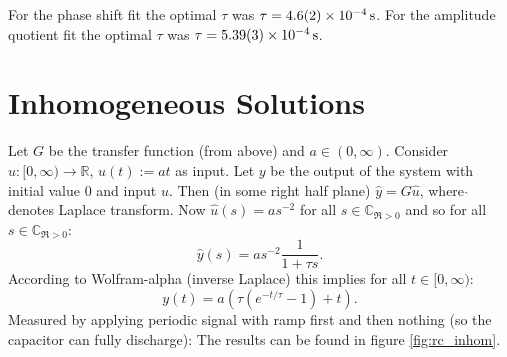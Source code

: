 \documentclass[10pt, a4paper]{article} %
\begin{document}
For the phase shift fit the optimal $\tau$ was $\tau = \SI{4.6 \pm 0.2 e-4}{\second}$.
For the amplitude quotient fit the optimal $\tau$ was $\tau = \SI{5.39 \pm 0.03 e-4}{\second}$.
\section{Inhomogeneous Solutions}
Let $G$ be the transfer function (from above) and $a \in (0, \infty)$.
Consider $u :[0, \infty) \to \mathbb{R}$, $u(t):=a t$ as input.
Let $y$ be the output of the system with initial value $0$ and input $u$.
Then (in some right half plane) $\hat y = G  \hat u$, where $\hat{}$ denotes Laplace transform.
Now $\hat u(s) = a s^{-2}$ for all $s \in \mathbb{C}_{\Re >0}$ and so for all $s \in \mathbb{C}_{\Re >0}$:
\begin{equation*}
	\hat y (s) = a s^{-2} \frac{1}{1+ \tau s}.
\end{equation*}
According to Wolfram-alpha (inverse Laplace) this implies for all $t\in[0, \infty)$:
\begin{equation*}
	y (t) = a(\tau ( e^{-t /\tau } -1) + t).
\end{equation*}
Measured by applying periodic signal with ramp first and then nothing (so the capacitor can fully discharge):
The results can be found in figure \ref{fig:rc_inhom}.
\end{document}
